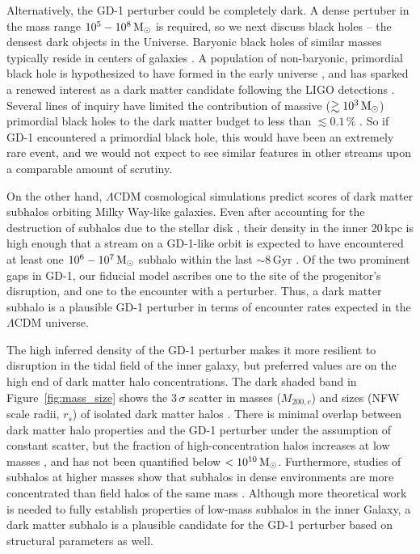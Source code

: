 \documentclass[twocolumn]{aastex62}
\begin{document}
Alternatively, the GD-1 perturber could be completely dark.
A dense pertuber in the mass range $10^5-10^8\,\rm M_\odot$ is required, so we next discuss black holes -- the densest dark objects in the Universe.
Baryonic black holes of similar masses typically reside in centers of galaxies \citep[the mass of Milky Way's supermassive black hole, Sgr A$^\star$, is $\approx4\times10^6\,\rm M_\odot$][]{boehle2016}.
A population of non-baryonic, primordial black hole is hypothesized to have formed in the early universe \citep{carr1974}, and has sparked a renewed interest as a dark matter candidate following the LIGO detections \citep{bird2016}.
Several lines of inquiry have limited the contribution of massive ($\gtrsim10^3\,\rm M_\odot$) primordial black holes to the dark matter budget to less than $\lesssim0.1\,\%$ \citep[and references within]{carr2016}.
So if GD-1 encountered a primordial black hole, this would have been an extremely rare event, and we would not expect to see similar features in other streams upon a comparable amount of scrutiny.

On the other hand, $\Lambda$CDM cosmological simulations predict scores of dark matter subhalos orbiting Milky Way-like galaxies.
Even after accounting for the destruction of subhalos due to the stellar disk \citep{donghia2010,gk2017}, their density in the inner 20\,kpc is high enough that a stream on a GD-1-like orbit is expected to have encountered at least one $10^6-10^7\rm\, M_\odot$ subhalo within the last $\sim8$\,Gyr \citep{erkal2016}.
Of the two prominent gaps in GD-1, our fiducial model ascribes one to the site of the progenitor's disruption, and one to the encounter with a perturber.
Thus, a dark matter subhalo is a plausible GD-1 perturber in terms of encounter rates expected in the $\Lambda$CDM universe.

The high inferred density of the GD-1 perturber makes it more resilient to disruption in the tidal field of the inner galaxy, but preferred values are on the high end of dark matter halo concentrations.
The dark shaded band in Figure~\ref{fig:mass_size} shows the $3\,\sigma$ scatter in masses ($M_{200,c}$) and sizes (NFW scale radii, $r_s$) of isolated dark matter halos \citep{diemer2018}.
There is minimal overlap between dark matter halo properties and the GD-1 perturber under the assumption of constant scatter, but the fraction of high-concentration halos increases at low masses \citep{diemer2015}, and has not been quantified below $<10^{10}\,\rm M_\odot$.
Furthermore, studies of subhalos at higher masses show that subhalos in dense environments are more concentrated than field halos of the same mass \citep[e.g.,][]{avilareese2005}.
Although more theoretical work is needed to fully establish properties of low-mass subhalos in the inner Galaxy, a dark matter subhalo is a plausible candidate for the GD-1 perturber based on structural parameters as well.
\end{document}
